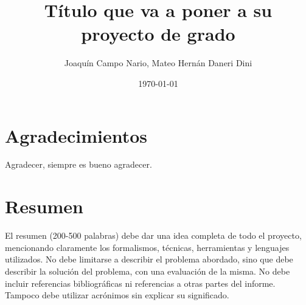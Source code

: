 \documentclass{prgrado}
\title{Título que va a poner a su proyecto de grado}
\author{Joaquín Campo Nario, Mateo Hernán Daneri Dini}
\date{\today}
\begin{document}

\frontmatter %

\maketitle



\chapter*{Agradecimientos}

Agradecer, siempre es bueno agradecer.




\chapter*{Resumen}

El resumen (200-500 palabras) debe dar una idea completa de todo el
proyecto, mencionando claramente los formalismos, técnicas, herramientas y lenguajes
utilizados. No debe limitarse a describir el problema abordado, sino que debe describir
la solución del problema, con una evaluación de la misma. No debe incluir referencias
bibliográficas ni referencias a otras partes del informe. Tampoco debe utilizar
acrónimos sin explicar su significado.


\hfill \break
{}


\tableofcontents
\newpage



\mainmatter %
\end{document}
